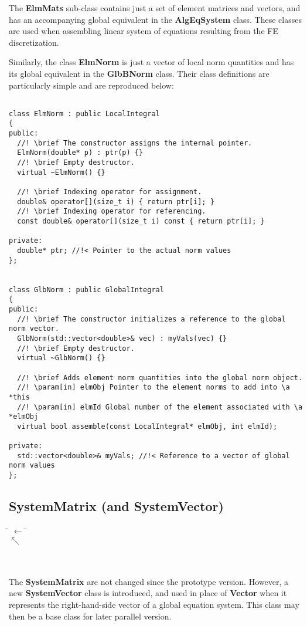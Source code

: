 \documentclass{article}
\begin{document}
The {\bf ElmMats} sub-class contains just a set of element matrices and vectors,
and has an accompanying global equivalent in the {\bf AlgEqSystem} class.
These classes are used when assembling linear system of equations resulting from
the FE discretization.

Similarly, the class {\bf ElmNorm} is just a vector of local norm quantities and
has its global equivalent in the {\bf GlbBNorm} class.
Their class definitions are particularly simple and are reproduced below:

{\small\begin{verbatim}

class ElmNorm : public LocalIntegral
{
public:
  //! \brief The constructor assigns the internal pointer.
  ElmNorm(double* p) : ptr(p) {}
  //! \brief Empty destructor.
  virtual ~ElmNorm() {}

  //! \brief Indexing operator for assignment.
  double& operator[](size_t i) { return ptr[i]; }
  //! \brief Indexing operator for referencing.
  const double& operator[](size_t i) const { return ptr[i]; }

private:
  double* ptr; //!< Pointer to the actual norm values
};


class GlbNorm : public GlobalIntegral
{
public:
  //! \brief The constructor initializes a reference to the global norm vector.
  GlbNorm(std::vector<double>& vec) : myVals(vec) {}
  //! \brief Empty destructor.
  virtual ~GlbNorm() {}

  //! \brief Adds element norm quantities into the global norm object.
  //! \param[in] elmObj Pointer to the element norms to add into \a *this
  //! \param[in] elmId Global number of the element associated with \a *elmObj
  virtual bool assemble(const LocalIntegral* elmObj, int elmId);

private:
  std::vector<double>& myVals; //!< Reference to a vector of global norm values
};
\end{verbatim}}

\subsection{SystemMatrix (and SystemVector)}
\begin{center}
\begin{minipage}{7cm}
\begin{tabbing}
 \= $\leftarrow$ \=
 \+ \\ $\nwarrow$ \+ \\
 \\ \\
\end{tabbing}
\end{minipage}
\hskip1cm
\begin{minipage}{7cm}
\end{minipage}
\end{center}

The {\bf SystemMatrix} are not changed since the prototype version.
However, a new {\bf SystemVector} class is introduced, and used in place of
{\bf Vector} when it represents the right-hand-side vector of a global equation
system.
This class may then be a base class for later parallel version.
\end{document}
